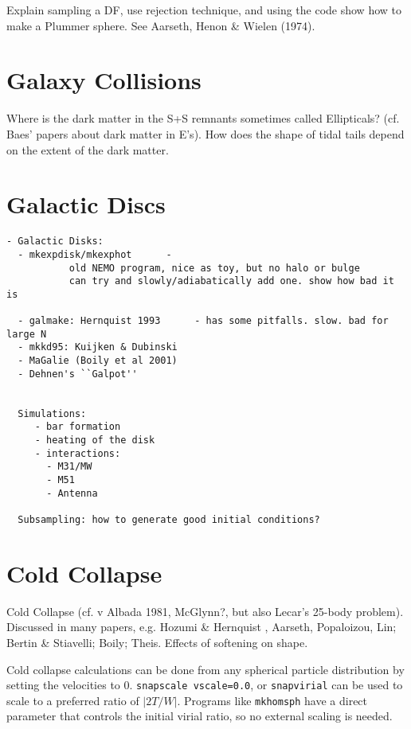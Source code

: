 \begin{itemize}
\begin{itemize}
Explain sampling a DF, use rejection technique, and
using the code show how to make a Plummer sphere. See
Aarseth, Henon \& Wielen (1974).

\section{Galaxy Collisions}


Where is the dark matter in the S+S remnants sometimes called Ellipticals?
(cf. Baes' papers about dark matter in E's). How does the shape
of tidal tails depend on the extent of the dark matter.


\section{Galactic Discs}

\footnotesize\begin{verbatim}
- Galactic Disks:
  - mkexpdisk/mkexphot      - 
           old NEMO program, nice as toy, but no halo or bulge
           can try and slowly/adiabatically add one. show how bad it is

  - galmake: Hernquist 1993      - has some pitfalls. slow. bad for large N
  - mkkd95: Kuijken & Dubinski
  - MaGalie (Boily et al 2001) 
  - Dehnen's ``Galpot''


  Simulations:
     - bar formation
     - heating of the disk
     - interactions:
       - M31/MW
       - M51
       - Antenna

  Subsampling: how to generate good initial conditions?

\end{verbatim}\normalsize



\section{Cold Collapse}


Cold Collapse (cf. v Albada 1981, McGlynn?, but also Lecar's 25-body problem).
Discussed in many papers, e.g. Hozumi \& Hernquist ,
Aarseth, Popaloizou, Lin;  Bertin \& Stiavelli; Boily; Theis. Effects
of softening on shape.

Cold collapse calculations can be done from any spherical particle
distribution by setting the velocities to 0. {\tt snapscale vscale=0.0},
or {\tt snapvirial} can be used to scale to a preferred ratio of $|2T/W|$.
Programs like {\tt mkhomsph} have a direct parameter that controls
the initial virial ratio, so no external scaling is needed.




\end{itemize}
\end{itemize}
